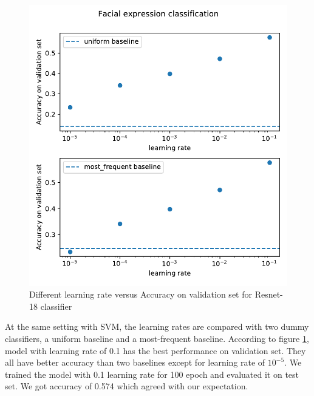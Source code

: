 \documentclass{article}
\begin{document}
\begin{figure}[htp]
    \centering
    \includegraphics[width=\columnwidth]{figures/Resnet}
    \caption{Different learning rate versus Accuracy on validation set for Resnet-18 classifier}
    \label{fig:resnet_lr}
\end{figure}

At the same setting with SVM, the learning rates are compared with two dummy classifiers, a uniform baseline and a most-frequent baseline. According to figure \ref{fig:resnet_lr}, model with learning rate of 0.1 has the best performance on validation set. They all have better accuracy than two baselines except for learning rate of $10^{-5}$. We trained the model with 0.1 learning rate for 100 epoch and evaluated it on test set. We got accuracy of 0.574 which agreed with our expectation.
\end{document}
